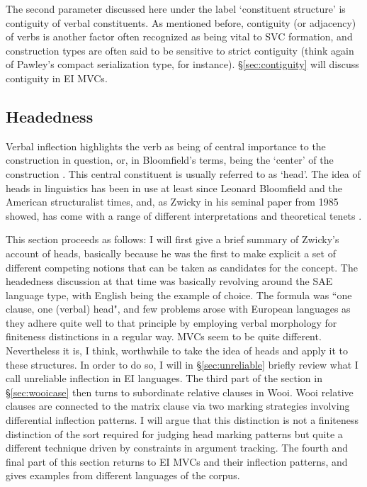 The second parameter discussed here under the label `constituent structure' is contiguity of verbal constituents. As mentioned before, contiguity (or adjacency) of verbs is another factor often recognized as being vital to SVC formation, and construction types are often said to be sensitive to strict contiguity (think again of Pawley's compact serialization type, for instance). §\ref{sec:contiguity} will discuss contiguity in EI MVCs.

\subsection{Headedness}\label{sec:headedness}

Verbal inflection highlights the verb as being of central importance to the construction in question, or, in Bloomfield's terms, being the `center' of the construction \citep{bloomfield1933language}. This central constituent is usually referred to as `head'. The idea of heads in linguistics has been in use at least since Leonard Bloomfield and the American structuralist times, and, as Zwicky in his seminal paper from 1985 showed, has come with a range of different interpretations and theoretical tenets \citep{zwicky1985heads1}. 

This section proceeds as follows: I will first give a brief summary of Zwicky's account of heads, basically because he was the first to make explicit a set of different competing notions that can be taken as candidates for the concept. The headedness discussion at that time was basically revolving around the \textsc{SAE} language type, with English being the example of choice. The formula was ``one clause, one (verbal) head", and few problems arose with European languages as they adhere quite well to that principle by employing verbal morphology for finiteness distinctions in a regular way. MVCs seem to be quite different. Nevertheless it is, I think, worthwhile to take the idea of heads and apply it to these structures. In order to do so, I will in §\ref{sec:unreliable} briefly review what I call unreliable inflection in EI languages. The third part of the section in §\ref{sec:wooicase} then turns to subordinate relative clauses in Wooi. Wooi relative clauses are connected to the matrix clause via two marking strategies involving differential inflection patterns. I will argue that this distinction is not a finiteness distinction of the sort required for judging head marking patterns but quite a different technique driven by constraints in argument tracking. The fourth and final part of this section returns to EI MVCs and their inflection patterns, and gives examples from different languages of the corpus.

